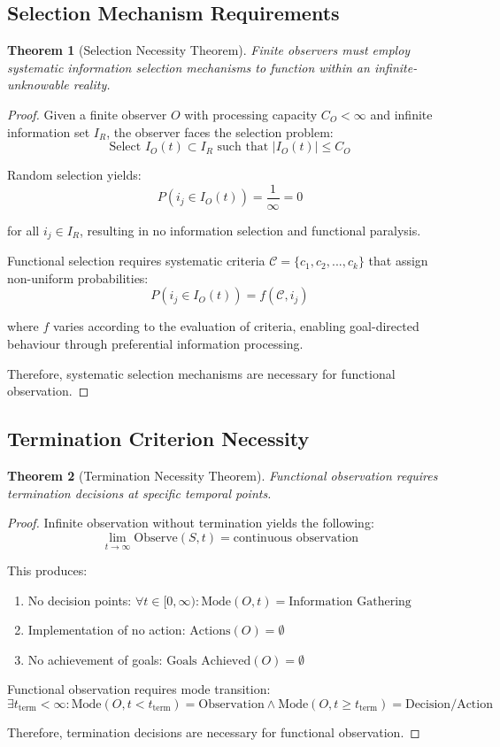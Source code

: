 \documentclass[12pt,a4paper]{article}
\newtheorem{theorem}{Theorem}[section]
\begin{document}
\subsection{Selection Mechanism Requirements}

\begin{theorem}[Selection Necessity Theorem]
Finite observers must employ systematic information selection mechanisms to function within an infinite-unknowable reality.
\end{theorem}

\begin{proof}
Given a finite observer $O$ with processing capacity $C_O < \infty$ and infinite information set $I_R$, the observer faces the selection problem:
$$\text{Select } I_O(t) \subset I_R \text{ such that } |I_O(t)| \leq C_O$$

Random selection yields:
$$P(i_j \in I_O(t)) = \frac{1}{\infty} = 0$$

for all $i_j \in I_R$, resulting in no information selection and functional paralysis.

Functional selection requires systematic criteria $\mathcal{C} = \{c_1, c_2, ..., c_k\}$ that assign non-uniform probabilities:
$$P(i_j \in I_O(t)) = f(\mathcal{C}, i_j)$$

where $f$ varies according to the evaluation of criteria, enabling goal-directed behaviour through preferential information processing.

Therefore, systematic selection mechanisms are necessary for functional observation.
\end{proof}

\subsection{Termination Criterion Necessity}

\begin{theorem}[Termination Necessity Theorem]
Functional observation requires termination decisions at specific temporal points.
\end{theorem}

\begin{proof}
Infinite observation without termination yields the following:
$$\lim_{t \to \infty} \text{Observe}(S,t) = \text{continuous observation}$$

This produces:
\begin{enumerate}
\item No decision points: $\forall t \in [0,\infty): \text{Mode}(O,t) = \text{Information Gathering}$
\item Implementation of no action: $\text{Actions}(O) = \emptyset$
\item No achievement of goals: $\text{Goals Achieved}(O) = \emptyset$
\end{enumerate}

Functional observation requires mode transition:
$$\exists t_{\text{term}} < \infty : \text{Mode}(O, t < t_{\text{term}}) = \text{Observation} \land \text{Mode}(O, t \geq t_{\text{term}}) = \text{Decision/Action}$$

Therefore, termination decisions are necessary for functional observation.
\end{proof}
\end{document}
